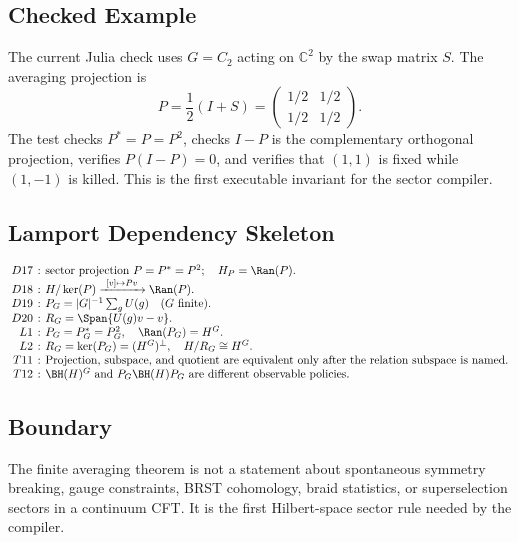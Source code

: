\subsection{Checked Example}

The current Julia check uses \(G=C_2\) acting on \(\mathbb C^2\) by the swap
matrix \(S\).  The averaging projection is
\[
  P=\frac12(I+S)
   =
  \begin{pmatrix}
    1/2 & 1/2\\
    1/2 & 1/2
  \end{pmatrix}.
\]
The test checks \(P^*=P=P^2\), checks \(I-P\) is the complementary orthogonal
projection, verifies \(P(I-P)=0\), and verifies that \((1,1)\) is fixed while
\((1,-1)\) is killed.  This is the first executable invariant for the sector
compiler.

\subsection{Lamport Dependency Skeleton}

{\small
\[
\setlength{\arraycolsep}{2pt}
\begin{array}{rcl}
D17 &:& \text{sector projection }P=P^*=P^2;\quad H_P=\Ran(P).\\
D18 &:& H/\ker(P)\xrightarrow{\ [v]\mapsto Pv\ }\Ran(P).\\
D19 &:& P_G=|G|^{-1}\sum_g U(g)\quad (G\text{ finite}).\\
D20 &:& R_G=\Span\{U(g)v-v\}.\\
L1 &:& P_G=P_G^*=P_G^2,\quad \Ran(P_G)=H^G.\\
L2 &:& R_G=\ker(P_G)=(H^G)^\perp,\quad H/R_G\cong H^G.\\
T11 &:& \text{Projection, subspace, and quotient are equivalent only after the relation subspace is named.}\\
T12 &:& \BH(H)^G\text{ and }P_G\BH(H)P_G\text{ are different observable policies.}
\end{array}
\]
}

\subsection{Boundary}

The finite averaging theorem is not a statement about spontaneous symmetry
breaking, gauge constraints, BRST cohomology, braid statistics, or superselection
sectors in a continuum CFT.  It is the first Hilbert-space sector rule needed by
the compiler.
